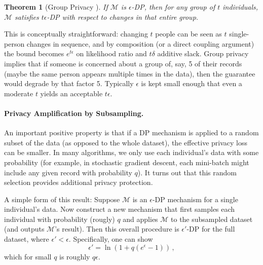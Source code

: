 \documentclass[11pt, a4paper]{article}
\newtheorem{theorem}{Theorem}
\begin{document}
\begin{theorem}[Group Privacy \cite{DworkRoth2014}]
If $\mathcal{M}$ is $\epsilon$-DP, then for any group of $t$ individuals, $\mathcal{M}$ satisfies $t\epsilon$-DP with respect to changes in that entire group.
\end{theorem}

This is conceptually straightforward: changing $t$ people can be seen as $t$ single-person changes in sequence,
and by composition (or a direct coupling argument) the bound becomes $e^{t\epsilon}$ on likelihood ratio and $t\delta$ additive slack.
Group privacy implies that if someone is concerned about a group of, say, 5 of their records (maybe the same person appears multiple times in the data),
then the guarantee would degrade by that factor 5.
Typically $\epsilon$ is kept small enough that even a moderate $t$ yields an acceptable $t\epsilon$.


\paragraph{Privacy Amplification by Subsampling.} An important positive property is that if a DP mechanism is applied to a random subset of the data (as opposed to the whole dataset),
the effective privacy loss can be smaller.
In many algorithms, we only use each individual's data with some probability (for example, in stochastic gradient descent, each mini-batch might include any given record with probability $q$).
It turns out that this random selection provides additional privacy protection.

A simple form of this result: Suppose $\mathcal{M}$ is an $\epsilon$-DP mechanism for a single individual's data.
Now construct a new mechanism that first samples each individual with probability (rougly) $q$ 
and applies $\mathcal{M}$ to the subsampled dataset (and outputs $\mathcal{M}$'s result).
Then this overall procedure is $\epsilon'$-DP for the full dataset, where $\epsilon' < \epsilon$. 
Specifically, one can show 
\[ \epsilon' = \ln(1 + q(e^\epsilon - 1))\,, \] 
which for small $q$ is roughly $q\epsilon$. 
\end{document}
